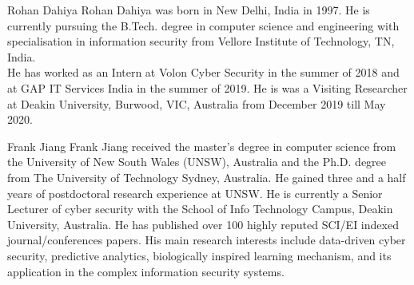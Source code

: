 \documentclass[journal]{IEEEtran}
\begin{document}
%

% 
\newpage

\begin{IEEEbiography}{Rohan Dahiya}
Rohan Dahiya was born in New Delhi, India in 1997. He is currently pursuing the B.Tech. degree in computer science and engineering with specialisation in information security from Vellore Institute of Technology, TN, India. \\ He has worked as an Intern at Volon Cyber Security in the summer of 2018 and at GAP IT Services India in the summer of 2019. He is was a Visiting Researcher at Deakin University, Burwood, VIC, Australia from December 2019 till May 2020.
\end{IEEEbiography}

\begin{IEEEbiography}{Frank Jiang}
Frank Jiang received the master’s degree in computer science from the University of New South Wales (UNSW), Australia and the Ph.D. degree from The University of Technology Sydney, Australia. He gained three and a half years of postdoctoral research experience at UNSW. He is currently a Senior Lecturer of cyber security with the School of Info Technology Campus, Deakin University, Australia. He has published over 100 highly reputed SCI/EI indexed journal/conferences papers. His main research interests include data-driven cyber security, predictive analytics, biologically inspired learning mechanism, and its application in the complex information security systems.
\end{IEEEbiography}
\end{document}
